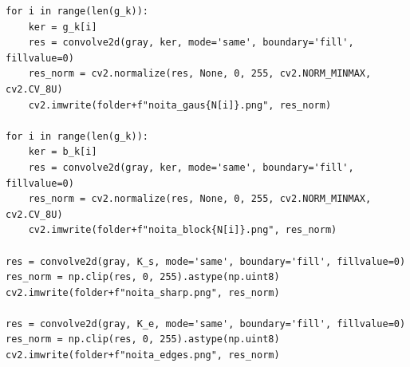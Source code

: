 \documentclass[a4paper, 12pt]{article}
\begin{document}
\begin{lstlisting}[caption={Код для обработки изображения во 2 пункте}]
for i in range(len(g_k)):
    ker = g_k[i]
    res = convolve2d(gray, ker, mode='same', boundary='fill', fillvalue=0)
    res_norm = cv2.normalize(res, None, 0, 255, cv2.NORM_MINMAX, cv2.CV_8U)
    cv2.imwrite(folder+f"noita_gaus{N[i]}.png", res_norm)

for i in range(len(g_k)):
    ker = b_k[i]
    res = convolve2d(gray, ker, mode='same', boundary='fill', fillvalue=0)
    res_norm = cv2.normalize(res, None, 0, 255, cv2.NORM_MINMAX, cv2.CV_8U)
    cv2.imwrite(folder+f"noita_block{N[i]}.png", res_norm)

res = convolve2d(gray, K_s, mode='same', boundary='fill', fillvalue=0)
res_norm = np.clip(res, 0, 255).astype(np.uint8)
cv2.imwrite(folder+f"noita_sharp.png", res_norm)

res = convolve2d(gray, K_e, mode='same', boundary='fill', fillvalue=0)
res_norm = np.clip(res, 0, 255).astype(np.uint8)
cv2.imwrite(folder+f"noita_edges.png", res_norm)
\end{lstlisting}
\end{document}
